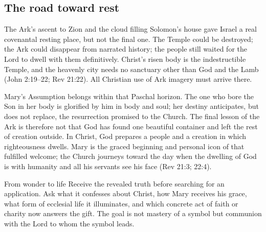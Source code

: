 \subsection{The road toward rest}

The Ark's ascent to Zion and the cloud filling Solomon's house gave Israel a
real covenantal resting place, but not the final one.  The Temple could be
destroyed; the Ark could disappear from narrated history; the people still
waited for the Lord to dwell with them definitively.  Christ's risen body is
the indestructible Temple, and the heavenly city needs no sanctuary other than
God and the Lamb (John 2:19--22; Rev 21:22).  All Christian use of Ark imagery
must arrive there.

Mary's Assumption belongs within that Paschal horizon.  The one who bore the
Son in her body is glorified by him in body and soul; her destiny anticipates,
but does not replace, the resurrection promised to the Church.  The final
lesson of the Ark is therefore not that God has found one beautiful container
and left the rest of creation outside.  In Christ, God prepares a people and a
creation in which righteousness dwells.  Mary is the graced beginning and
personal icon of that fulfilled welcome; the Church journeys toward the day
when the dwelling of God is with humanity and all his servants see his face
(Rev 21:3; 22:4).

\begin{studybox}{From wonder to life}
Receive the revealed truth before searching for an application.  Ask what it
confesses about Christ, how Mary receives his grace, what form of ecclesial
life it illuminates, and which concrete act of faith or charity now answers
the gift.  The goal is not mastery of a symbol but communion with the Lord to
whom the symbol leads.
\end{studybox}
